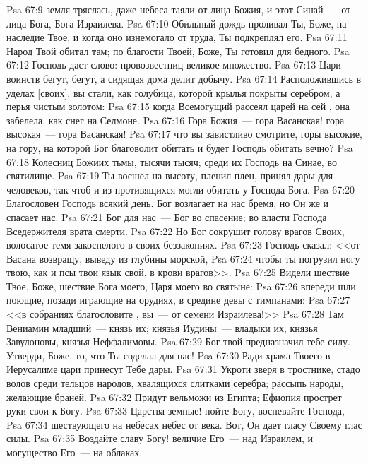 \vs Psa 67:9 земля тряслась, даже небеса таяли от лица Божия, и этот Синай~--- от лица Бога, Бога Израилева.
\vs Psa 67:10 Обильный дождь проливал Ты, Боже, на наследие Твое, и когда оно изнемогало от труда, Ты подкреплял его.
\vs Psa 67:11 Народ Твой обитал там; по благости Твоей, Боже, Ты готовил  для бедного.
\vs Psa 67:12 Господь даст слово: провозвестниц великое множество.
\vs Psa 67:13 Цари воинств бегут, бегут, а сидящая дома делит добычу.
\vs Psa 67:14 Расположившись в уделах [своих], вы стали, как голубица, которой крылья покрыты серебром, а перья чистым золотом:
\vs Psa 67:15 когда Всемогущий рассеял царей на сей , она забелела, как снег на Селмоне.
\vs Psa 67:16 Гора Божия~--- гора Васанская! гора высокая~--- гора Васанская!
\vs Psa 67:17 что вы завистливо смотрите, горы высокие, на гору, на которой Бог благоволит обитать и будет Господь обитать вечно?
\vs Psa 67:18 Колесниц Божиих тьмы, тысячи тысяч; среди их Господь на Синае, во святилище.
\vs Psa 67:19 Ты восшел на высоту, пленил плен, принял дары для человеков, так чтоб и из противящихся могли обитать у Господа Бога.
\vs Psa 67:20 Благословен Господь всякий день. Бог возлагает на нас бремя, но Он же и спасает нас.
\vs Psa 67:21 Бог для нас~--- Бог во спасение; во власти Господа Вседержителя врата смерти.
\vs Psa 67:22 Но Бог сокрушит голову врагов Своих, волосатое темя закоснелого в своих беззакониях.
\vs Psa 67:23 Господь сказал: <<от Васана возвращу, выведу из глубины морской,
\vs Psa 67:24 чтобы ты погрузил ногу твою, как и псы твои язык свой, в крови врагов>>.
\vs Psa 67:25 Видели шествие Твое, Боже, шествие Бога моего, Царя моего во святыне:
\vs Psa 67:26 впереди шли поющие, позади играющие на орудиях, в средине девы с тимпанами:
\vs Psa 67:27 <<в собраниях благословите , вы~--- от семени Израилева!>>
\vs Psa 67:28 Там Вениамин младший~--- князь их; князья Иудины~--- владыки их, князья Завулоновы, князья Неффалимовы.
\vs Psa 67:29 Бог твой предназначил тебе силу. Утверди, Боже, то, что Ты соделал для нас!
\vs Psa 67:30 Ради храма Твоего в Иерусалиме цари принесут Тебе дары.
\vs Psa 67:31 Укроти зверя в тростнике, стадо волов среди тельцов народов, хвалящихся слитками серебра; рассыпь народы, желающие браней.
\vs Psa 67:32 Придут вельможи из Египта; Ефиопия прострет руки свои к Богу.
\vs Psa 67:33 Царства земные! пойте Богу, воспевайте Господа,
\vs Psa 67:34 шествующего на небесах небес от века. Вот, Он дает гласу Своему глас силы.
\vs Psa 67:35 Воздайте славу Богу! величие Его~--- над Израилем, и могущество Его~--- на облаках.

